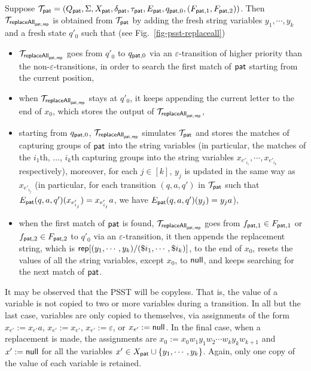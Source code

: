  Suppose $\mathcal{T}_{\mathsf{pat}} = (Q_{\mathsf{pat}}, \Sigma, X_{\mathsf{pat}}, \delta_{\mathsf{pat}}, \tau_{\mathsf{pat}}, E_{\mathsf{pat}}, q_{\mathsf{pat},0}, (F_{\mathsf{pat},1}, F_{\mathsf{pat},2}))$.
Then $\mathcal{T}_{\mathsf{replaceAll}_{\mathsf{pat},\mathsf{rep}}}$ is obtained from $\mathcal{T}_{\mathsf{pat}}$ by adding the fresh string variables $y_1, \cdots, y_k$ and a fresh state $q'_0$ such that (see Fig.~\ref{fig-psst-replaceall})
\begin{itemize}
    \item $\mathcal{T}_{\mathsf{replaceAll}_{\mathsf{pat},\mathsf{rep}}}$ goes from $q'_0$ to $q_{\mathsf{pat},0}$ via an $\varepsilon$-transition of higher priority than the non-$\varepsilon$-transitions, in order to search the first match of $\mathsf{pat}$ starting from the current position,
    \item when $\mathcal{T}_{\mathsf{replaceAll}_{\mathsf{pat},\mathsf{rep}}}$ stays at $q'_0$, it keeps appending the current letter to the end of $x_0$, which stores the output of $\mathcal{T}_{\mathsf{replaceAll}_{\mathsf{pat},\mathsf{rep}}}$,
    \item starting from $q_{\mathsf{pat}, 0}$, $\mathcal{T}_{\mathsf{replaceAll}_{\mathsf{pat},\mathsf{rep}}}$ simulates $\mathcal{T}_{\mathsf{pat}}$ and stores the matches of capturing groups of $\mathsf{pat}$ into the string variables (in particular,
    the matches of the $i_1$th, $\ldots$, $i_k$th capturing groups into the string variables $x_{e'_{i_1}}, \cdots, x_{e'_{i_k}}$ respectively), moreover, for each $j \in [k]$, $y_j$ is updated in the same way as $x_{e'_{i_j}}$ (in particular, for each transition $(q, a, q')$ in $\mathcal{T}_{\mathsf{pat}}$ such that $E_{\mathsf{pat}}(q, a, q')(x_{e'_{i_j}}) = x_{e'_{i_j}} a$,  we have $E_{\mathsf{pat}}(q, a, q')(y_j) = y_j a$),

    \item when the first match of $\mathsf{pat}$ is found, $\mathcal{T}_{\mathsf{replaceAll}_{\mathsf{pat},\mathsf{rep}}}$ goes from $f_{\mathsf{pat},1} \in F_{\mathsf{pat}, 1}$ or $f_{\mathsf{pat}, 2} \in F_{\mathsf{pat}, 2}$ to $q'_0$ via an $\varepsilon$-transition, it then appends the replacement string, which is $\mathsf{rep}[(y_1, \cdots, y_k)/(\$i_1,\cdots, \$i_k)]$, to the end of $x_0$, resets the values of all the string variables, except $x_0$, to $\mathsf{null}$, and keeps searching for the next match of $\mathsf{pat}$.
\end{itemize}

It may be observed that the PSST will be copyless.
That is, the value of a variable is not copied to two or more variables during a transition.
In all but the last case, variables are only copied to themselves, via assignments of the form $x_{e'} := x_{e'} a$, $x_{e'} := x_{e'}$, $x_{e'} := \varepsilon$, or $x_{e'} := \mathsf{null}$.
In the final case, when a replacement is made, the assignments are
$x_0 := x_0 w_1y_1 w_2 \cdots w_k y_k w_{k+1}$
and
$x^\prime := \mathsf{null}$ for all the variables $x^\prime \in X_{\mathsf{pat}} \cup \{y_1, \cdots, y_k\}$.
Again, only one copy of the value of each variable is retained.

